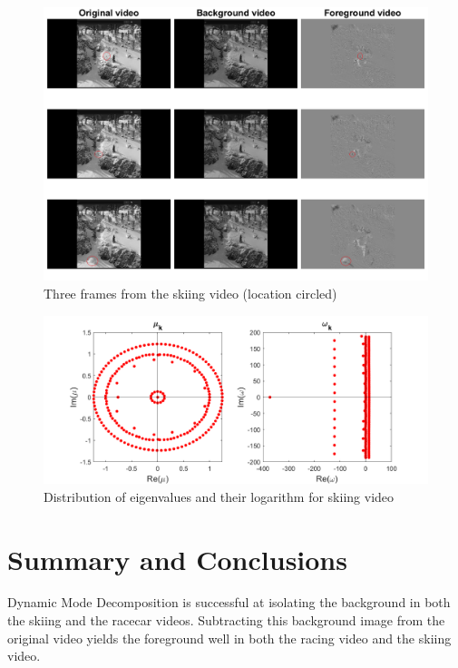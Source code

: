 \documentclass{article}
\begin{document}
\begin{figure}
	\centering
	\includegraphics[scale=0.8]{ski_drop_result}
	\caption{Three frames from the skiing video (location circled)}
	\label{fig:fig4}
\end{figure}

\begin{figure}
	\centering
	\includegraphics[scale=0.7]{ski_drop_eigen}
	\caption{Distribution of eigenvalues and their logarithm for skiing video}
	\label{fig:fig2}
\end{figure}


\section{Summary and Conclusions}

Dynamic Mode Decomposition is successful at isolating the background in both the skiing and the racecar videos. Subtracting this background image from the original video yields the foreground well in both the racing video and the skiing video. 
\end{document}
